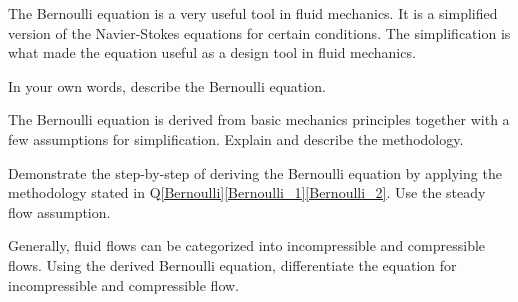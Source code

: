 \clearpage		%
\question{}\label{Bernoulli}

\listbeginx	%

	\item \label{Bernoulli_1}The Bernoulli equation is a very useful tool in fluid mechanics. It is a simplified version of the Navier-Stokes equations for certain conditions. The simplification is what made the equation useful as a design tool in fluid mechanics.  
	
	
		
		\listbegin

	\item In your own words, describe the Bernoulli equation.   
	


    \item \label{Bernoulli_2}The Bernoulli equation is derived from basic mechanics principles together with a few assumptions for simplification. Explain and describe the methodology.   
	

		
	\item Demonstrate the step-by-step of deriving the Bernoulli equation by applying the methodology stated in Q\ref{Bernoulli}\ref{Bernoulli_1}\ref{Bernoulli_2}. Use the steady flow assumption.   
	


    \item Generally, fluid flows can be categorized into incompressible and compressible flows. Using the derived Bernoulli equation, differentiate the equation for incompressible and compressible flow.   
	
